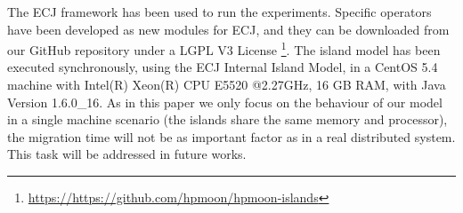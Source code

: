 \documentclass[Afour,sageh,times]{sagej}
\begin{document}
The ECJ framework \cite{ECJ} has been used to run the
experiments. Specific operators have been developed as new modules for
ECJ, and they can be downloaded from our GitHub repository under a
LGPL V3 License
\footnote{\url{https://https://github.com/hpmoon/hpmoon-islands}}. The
island model has been executed synchronously, using the ECJ Internal
Island Model, in a CentOS 5.4 machine with Intel(R) Xeon(R) CPU E5520
@2.27GHz, 16 GB RAM, with Java Version 1.6.0\_16. As in this paper we
only focus on the behaviour of our model in a single machine scenario
(the islands share the same memory and processor), the migration time
will not be as important factor as in a real distributed system. This
task will be addressed in future works. %
%
%

\end{document}

